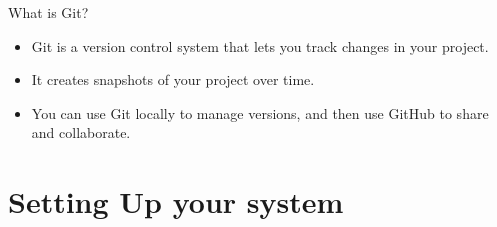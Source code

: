 \documentclass[9pt, aspectratio=169]{beamer}
\begin{document}
\begin{frame}{What is Git?}
    \begin{itemize}
        \item Git is a version control system that lets you track changes in your project.
        \item It creates snapshots of your project over time.
        \item You can use Git locally to manage versions, and then use GitHub to share and collaborate.
    \end{itemize}
\end{frame}

\section{Setting Up your system}
\end{document}
